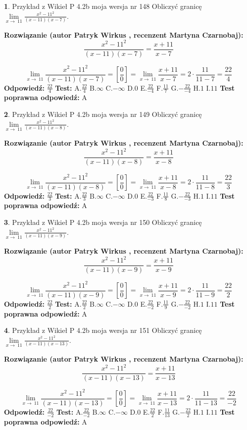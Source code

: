 \documentclass[12pt, a4paper]{article}
\theoremstyle{definition} %
\newtheorem{zad}{}
\newcommand{\zadStart}[1]{\begin{zad}#1\newline}
\newcommand{\zadStop}{\end{zad}}
\newcommand{\rozwStart}[2]{\noindent \textbf{Rozwiązanie (autor #1 , recenzent #2): }\newline}
\newcommand{\rozwStop}{\newline}
\newcommand{\odpStart}{\noindent \textbf{Odpowiedź:}\newline}
\newcommand{\odpStop}{\newline}
\newcommand{\testStart}{\noindent \textbf{Test:}\newline}
\newcommand{\testStop}{\newline}
\newcommand{\kluczStart}{\noindent \textbf{Test poprawna odpowiedź:}\newline}
\newcommand{\kluczStop}{\newline}
\begin{document}
\zadStart{Przykład z Wikieł P 4.2b moja wersja nr 148}
Obliczyć granicę $\lim\limits_{x\to\ 11}\frac{x^{2}-11^{2}}{(x-11)(x-7)}$.
\zadStop
\rozwStart{Patryk Wirkus}{Martyna Czarnobaj}
$$\frac{x^{2}-11^{2}}{(x-11)(x-7)}=\frac{x+11}{x-7}$$

$$\lim\limits_{x\to\ 11}\frac{x^{2}-11^{2}}{(x-11)(x-7)}=[\frac{0}{0}]=\lim\limits_{x\to\ 11}\frac{x+11}{x-7}=2 \cdot \frac{11}{11-7} = \frac{22}{4}$$
\rozwStop
\odpStart
$\frac{22}{4}$
\odpStop
\testStart
A.$\frac{22}{4}$
B.$\infty$
C.$-\infty$
D.$0$
E.$\frac{22}{-4}$
F.$\frac{11}{7}$
G.$-\frac{22}{-4}$
H.$1$
I.$11$
\testStop
\kluczStart
A
\kluczStop



\zadStart{Przykład z Wikieł P 4.2b moja wersja nr 149}
Obliczyć granicę $\lim\limits_{x\to\ 11}\frac{x^{2}-11^{2}}{(x-11)(x-8)}$.
\zadStop
\rozwStart{Patryk Wirkus}{Martyna Czarnobaj}
$$\frac{x^{2}-11^{2}}{(x-11)(x-8)}=\frac{x+11}{x-8}$$

$$\lim\limits_{x\to\ 11}\frac{x^{2}-11^{2}}{(x-11)(x-8)}=[\frac{0}{0}]=\lim\limits_{x\to\ 11}\frac{x+11}{x-8}=2 \cdot \frac{11}{11-8} = \frac{22}{3}$$
\rozwStop
\odpStart
$\frac{22}{3}$
\odpStop
\testStart
A.$\frac{22}{3}$
B.$\infty$
C.$-\infty$
D.$0$
E.$\frac{22}{-3}$
F.$\frac{11}{8}$
G.$-\frac{22}{-3}$
H.$1$
I.$11$
\testStop
\kluczStart
A
\kluczStop



\zadStart{Przykład z Wikieł P 4.2b moja wersja nr 150}
Obliczyć granicę $\lim\limits_{x\to\ 11}\frac{x^{2}-11^{2}}{(x-11)(x-9)}$.
\zadStop
\rozwStart{Patryk Wirkus}{Martyna Czarnobaj}
$$\frac{x^{2}-11^{2}}{(x-11)(x-9)}=\frac{x+11}{x-9}$$

$$\lim\limits_{x\to\ 11}\frac{x^{2}-11^{2}}{(x-11)(x-9)}=[\frac{0}{0}]=\lim\limits_{x\to\ 11}\frac{x+11}{x-9}=2 \cdot \frac{11}{11-9} = \frac{22}{2}$$
\rozwStop
\odpStart
$\frac{22}{2}$
\odpStop
\testStart
A.$\frac{22}{2}$
B.$\infty$
C.$-\infty$
D.$0$
E.$\frac{22}{-2}$
F.$\frac{11}{9}$
G.$-\frac{22}{-2}$
H.$1$
I.$11$
\testStop
\kluczStart
A
\kluczStop



\zadStart{Przykład z Wikieł P 4.2b moja wersja nr 151}
Obliczyć granicę $\lim\limits_{x\to\ 11}\frac{x^{2}-11^{2}}{(x-11)(x-13)}$.
\zadStop
\rozwStart{Patryk Wirkus}{Martyna Czarnobaj}
$$\frac{x^{2}-11^{2}}{(x-11)(x-13)}=\frac{x+11}{x-13}$$

$$\lim\limits_{x\to\ 11}\frac{x^{2}-11^{2}}{(x-11)(x-13)}=[\frac{0}{0}]=\lim\limits_{x\to\ 11}\frac{x+11}{x-13}=2 \cdot \frac{11}{11-13} = \frac{22}{-2}$$
\rozwStop
\odpStart
$\frac{22}{-2}$
\odpStop
\testStart
A.$\frac{22}{-2}$
B.$\infty$
C.$-\infty$
D.$0$
E.$\frac{22}{2}$
F.$\frac{11}{13}$
G.$-\frac{22}{2}$
H.$1$
I.$11$
\testStop
\kluczStart
A
\kluczStop
\end{document}
